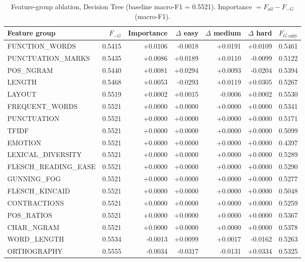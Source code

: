 
\begin{table}[ht]
\centering
\small
\caption{Feature-group ablation, Decision Tree (baseline macro-F1 = 0.5521). Importance $= F_{all} - F_{-G}$ (macro-F1).}
\label{tab:ablation-features-tree}
\begin{tabular}{lrrrrrr}
\toprule
Feature group & $F_{-G}$ & Importance & $\Delta$ easy & $\Delta$ medium & $\Delta$ hard & $F_{G\text{ only}}$ \\
\midrule
FUNCTION\_WORDS & 0.5415 & +0.0106 & -0.0018 & +0.0191 & +0.0109 & 0.5461 \\
PUNCTUATION\_MARKS & 0.5435 & +0.0086 & +0.0189 & +0.0110 & -0.0099 & 0.5122 \\
POS\_NGRAM & 0.5440 & +0.0081 & +0.0294 & +0.0093 & -0.0204 & 0.5394 \\
LENGTH & 0.5468 & +0.0053 & -0.0293 & +0.0119 & +0.0305 & 0.5267 \\
LAYOUT & 0.5519 & +0.0002 & +0.0015 & -0.0006 & +0.0002 & 0.5530 \\
FREQUENT\_WORDS & 0.5521 & +0.0000 & +0.0000 & +0.0000 & +0.0000 & 0.5341 \\
PUNCTUATION & 0.5521 & +0.0000 & +0.0000 & +0.0000 & +0.0000 & 0.5171 \\
TFIDF & 0.5521 & +0.0000 & +0.0000 & +0.0000 & +0.0000 & 0.5099 \\
EMOTION & 0.5521 & +0.0000 & +0.0000 & +0.0000 & +0.0000 & 0.4397 \\
LEXICAL\_DIVERSITY & 0.5521 & +0.0000 & +0.0000 & +0.0000 & +0.0000 & 0.5289 \\
FLESCH\_READING\_EASE & 0.5521 & +0.0000 & +0.0000 & +0.0000 & +0.0000 & 0.5290 \\
GUNNING\_FOG & 0.5521 & +0.0000 & +0.0000 & +0.0000 & +0.0000 & 0.5277 \\
FLESCH\_KINCAID & 0.5521 & +0.0000 & +0.0000 & +0.0000 & +0.0000 & 0.5048 \\
CONTRACTIONS & 0.5521 & +0.0000 & +0.0000 & +0.0000 & +0.0000 & 0.5259 \\
POS\_RATIOS & 0.5521 & +0.0000 & +0.0000 & +0.0000 & +0.0000 & 0.5367 \\
CHAR\_NGRAM & 0.5521 & +0.0000 & +0.0000 & +0.0000 & +0.0000 & 0.5378 \\
WORD\_LENGTH & 0.5534 & -0.0013 & +0.0099 & +0.0017 & -0.0162 & 0.5263 \\
ORTHOGRAPHY & 0.5555 & -0.0034 & -0.0317 & -0.0131 & +0.0334 & 0.5325 \\
\bottomrule
\end{tabular}
\end{table}

